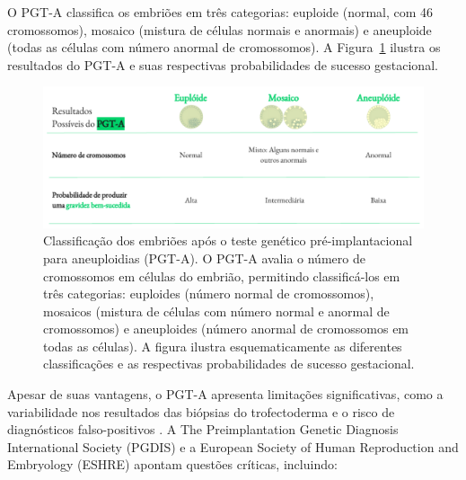 O PGT-A classifica os embriões em três categorias: euploide (normal, com 46 cromossomos), mosaico (mistura de células normais e anormais) e aneuploide (todas as células com número anormal de cromossomos). A Figura~\ref{fig:ResultadosPGT} ilustra os resultados do PGT-A e suas respectivas probabilidades de sucesso gestacional.

\begin{center}
    \begin{figure}[h]
        \captionsetup{font=footnotesize, position=above}
        \label{fig:ResultadosPGT}
        \centering
        \includegraphics[scale=0.5]{figuras/ResultadosPGT.pdf}
        \vspace{0.3cm} 
        \caption{Classificação dos embriões após o teste genético pré-implantacional para aneuploidias (PGT-A). O PGT-A avalia o número de cromossomos em células do embrião, permitindo classificá-los em três categorias: euploides (número normal de cromossomos), mosaicos (mistura de células com número normal e anormal de cromossomos) e aneuploides (número anormal de cromossomos em todas as células). A figura ilustra esquematicamente as diferentes classificações e as respectivas probabilidades de sucesso gestacional.}
    \end{figure}
\end{center}
\FloatBarrier

Apesar de suas vantagens, o PGT-A apresenta limitações significativas, como a variabilidade nos resultados das biópsias do trofectoderma e o risco de diagnósticos falso-positivos \cite{gleicher2021}. A The Preimplantation Genetic Diagnosis International Society (PGDIS) e a European Society of Human Reproduction and Embryology (ESHRE) apontam questões críticas, incluindo:

